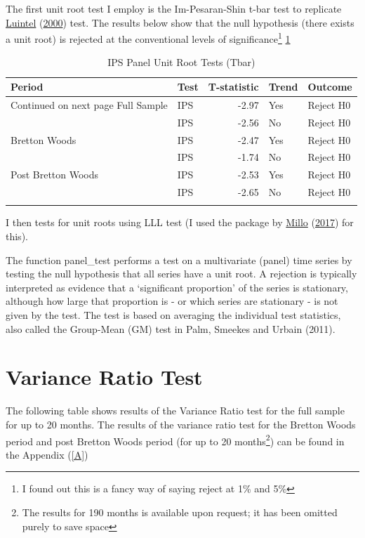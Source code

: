 \documentclass[11pt,preprint, authoryear]{elsarticle}
\numberwithin{equation}{section}
\numberwithin{figure}{section}
\numberwithin{table}{section}
\let\rmarkdownfootnote\footnote%
\def\footnote{\protect\rmarkdownfootnote}
\begin{document}
The first unit root test I employ is the Im-Pesaran-Shin t-bar test to
replicate \protect\hyperlink{ref-Kul}{Luintel}
(\protect\hyperlink{ref-Kul}{2000}) test. The results below show that
the null hypothesis (there exists a unit root) is rejected at the
conventional levels of significance\footnote{I found out this is a fancy
  way of saying reject at 1\% and 5\%} \ref{ips}

\begingroup\fontsize{12pt}{13pt}\selectfont
\begin{longtable}{llrll}
\caption{IPS Panel Unit Root Tests (Tbar)} \\ 
  \toprule
Period & Test & T-statistic & Trend & Outcome \\ 
  \hline 
\endhead 
\hline 
{\footnotesize Continued on next page} 
\endfoot 
\endlastfoot 
 \midrule
Full Sample & IPS & -2.97 & Yes & Reject H0 \\ 
   & IPS & -2.56 & No & Reject H0 \\ 
  Bretton Woods & IPS & -2.47 & Yes & Reject H0 \\ 
   & IPS & -1.74 & No & Reject H0 \\ 
  Post Bretton Woods & IPS & -2.53 & Yes & Reject H0 \\ 
   & IPS & -2.65 & No & Reject H0 \\ 
   \bottomrule
\label{ips}
\end{longtable}
\endgroup

I then tests for unit roots using LLL test (I used the package by
\protect\hyperlink{ref-plm}{Millo} (\protect\hyperlink{ref-plm}{2017})
for this).

The function panel\_test performs a test on a multivariate (panel) time
series by testing the null hypothesis that all series have a unit root.
A rejection is typically interpreted as evidence that a `significant
proportion' of the series is stationary, although how large that
proportion is - or which series are stationary - is not given by the
test. The test is based on averaging the individual test statistics,
also called the Group-Mean (GM) test in Palm, Smeekes and Urbain (2011).

\hypertarget{variance-ratio-test}{%
\section{\texorpdfstring{Variance Ratio Test
\label{Var}}{Variance Ratio Test }}\label{variance-ratio-test}}

The following table shows results of the Variance Ratio test for the
full sample for up to 20 months. The results of the variance ratio test
for the Bretton Woods period and post Bretton Woods period (for up to 20
months\footnote{The results for 190 months is available upon request; it
  has been omitted purely to save space}) can be found in the Appendix
(\ref{A})
\end{document}
